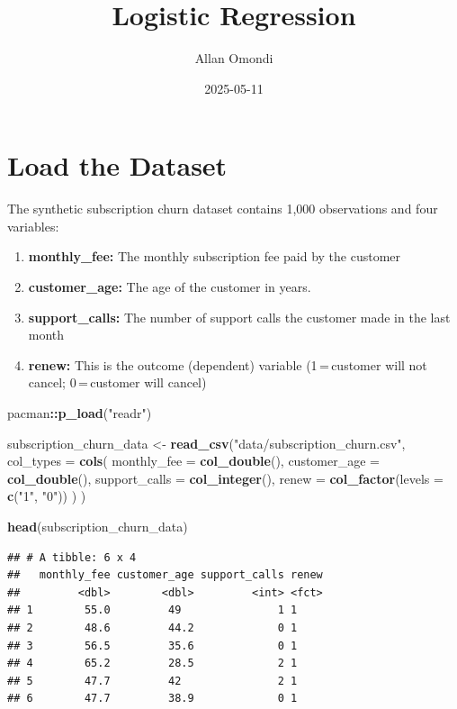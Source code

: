 \documentclass[
]{article}
\title{Logistic Regression}
\author{Allan Omondi}
\date{2025-05-11}
\newenvironment{Shaded}{\begin{snugshade}}{\end{snugshade}}
\newcommand{\AttributeTok}[1]{\textcolor[rgb]{0.13,0.29,0.53}{#1}}
\newcommand{\FunctionTok}[1]{\textcolor[rgb]{0.13,0.29,0.53}{\textbf{#1}}}
\newcommand{\NormalTok}[1]{#1}
\newcommand{\OtherTok}[1]{\textcolor[rgb]{0.56,0.35,0.01}{#1}}
\newcommand{\SpecialCharTok}[1]{\textcolor[rgb]{0.81,0.36,0.00}{\textbf{#1}}}
\newcommand{\StringTok}[1]{\textcolor[rgb]{0.31,0.60,0.02}{#1}}
\begin{document}
\maketitle

{
\setcounter{tocdepth}{4}
\tableofcontents
}
\section{Load the Dataset}\label{load-the-dataset}

The synthetic subscription churn dataset contains 1,000 observations and
four variables:

\begin{enumerate}
\def\labelenumi{\arabic{enumi}.}
\item
  \textbf{monthly\_fee:} The monthly subscription fee paid by the
  customer
\item
  \textbf{customer\_age:} The age of the customer in years.
\item
  \textbf{support\_calls:} The number of support calls the customer made
  in the last month
\item
  \textbf{renew:} This is the outcome (dependent) variable
  (1\,=\,customer will not cancel; 0\,=\,customer will cancel)
\end{enumerate}

\begin{Shaded}
\begin{Highlighting}[]
\NormalTok{pacman}\SpecialCharTok{::}\FunctionTok{p\_load}\NormalTok{(}\StringTok{"readr"}\NormalTok{)}

\NormalTok{subscription\_churn\_data }\OtherTok{\textless{}{-}} 
  \FunctionTok{read\_csv}\NormalTok{(}\StringTok{"data/subscription\_churn.csv"}\NormalTok{, }\AttributeTok{col\_types =} \FunctionTok{cols}\NormalTok{(}
    \AttributeTok{monthly\_fee =} \FunctionTok{col\_double}\NormalTok{(),}
    \AttributeTok{customer\_age =} \FunctionTok{col\_double}\NormalTok{(),}
    \AttributeTok{support\_calls =} \FunctionTok{col\_integer}\NormalTok{(),}
    \AttributeTok{renew =} \FunctionTok{col\_factor}\NormalTok{(}\AttributeTok{levels =} \FunctionTok{c}\NormalTok{(}\StringTok{"1"}\NormalTok{, }\StringTok{"0"}\NormalTok{))}
\NormalTok{    )}
\NormalTok{  )}

\FunctionTok{head}\NormalTok{(subscription\_churn\_data)}
\end{Highlighting}
\end{Shaded}

\begin{verbatim}
## # A tibble: 6 x 4
##   monthly_fee customer_age support_calls renew
##         <dbl>        <dbl>         <int> <fct>
## 1        55.0         49               1 1    
## 2        48.6         44.2             0 1    
## 3        56.5         35.6             0 1    
## 4        65.2         28.5             2 1    
## 5        47.7         42               2 1    
## 6        47.7         38.9             0 1
\end{verbatim}
\end{document}
